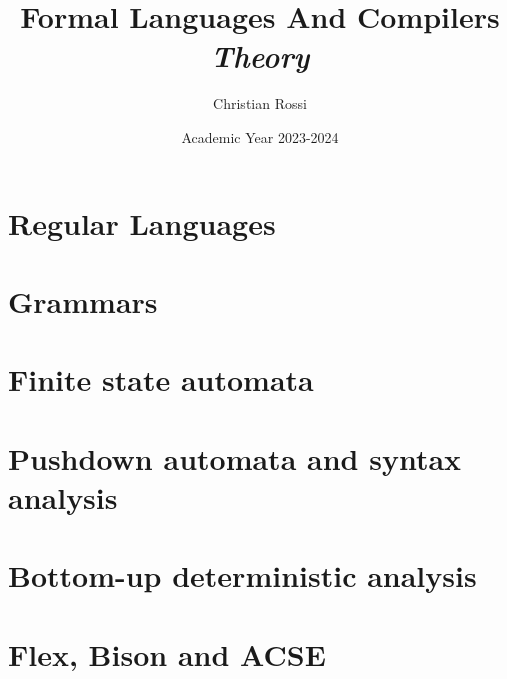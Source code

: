 \documentclass[12pt, a4paper]{report}
\title{Formal Languages And Compilers \\ \textit{Theory}}
\author{Christian Rossi}
\date{Academic Year 2023-2024}
\begin{document}
    \maketitle

    

    \cleardoublepage

    \tableofcontents

    \cleardoublepage

    \chapter{Regular Languages}
    
    
    
    

    \chapter{Grammars}
    
    
    
    
    
    
    
    
    
    
    
    

    \chapter{Finite state automata}
    
    
    
    
    
    
    
    

    \chapter{Pushdown automata and syntax analysis}
    
    
    
    

    \chapter{Bottom-up deterministic analysis}
    

    \chapter{Flex, Bison and ACSE}
    
    
    
    
\end{document}
